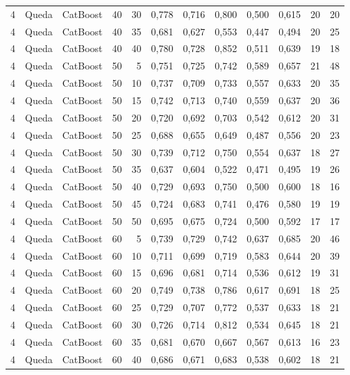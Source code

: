 \begin{longtable}{@{}rllrrrrrrrrr@{}}
4 & Queda & CatBoost & 40 & 30 & 0,778 & 0,716 & 0,800 & 0,500 & 0,615 & 20 & 20 \\
4 & Queda & CatBoost & 40 & 35 & 0,681 & 0,627 & 0,553 & 0,447 & 0,494 & 20 & 25 \\
4 & Queda & CatBoost & 40 & 40 & 0,780 & 0,728 & 0,852 & 0,511 & 0,639 & 19 & 18 \\
4 & Queda & CatBoost & 50 & 5 & 0,751 & 0,725 & 0,742 & 0,589 & 0,657 & 21 & 48 \\
4 & Queda & CatBoost & 50 & 10 & 0,737 & 0,709 & 0,733 & 0,557 & 0,633 & 20 & 35 \\
4 & Queda & CatBoost & 50 & 15 & 0,742 & 0,713 & 0,740 & 0,559 & 0,637 & 20 & 36 \\
4 & Queda & CatBoost & 50 & 20 & 0,720 & 0,692 & 0,703 & 0,542 & 0,612 & 20 & 31 \\
4 & Queda & CatBoost & 50 & 25 & 0,688 & 0,655 & 0,649 & 0,487 & 0,556 & 20 & 23 \\
4 & Queda & CatBoost & 50 & 30 & 0,739 & 0,712 & 0,750 & 0,554 & 0,637 & 18 & 27 \\
4 & Queda & CatBoost & 50 & 35 & 0,637 & 0,604 & 0,522 & 0,471 & 0,495 & 19 & 26 \\
4 & Queda & CatBoost & 50 & 40 & 0,729 & 0,693 & 0,750 & 0,500 & 0,600 & 18 & 16 \\
4 & Queda & CatBoost & 50 & 45 & 0,724 & 0,683 & 0,741 & 0,476 & 0,580 & 19 & 19 \\
4 & Queda & CatBoost & 50 & 50 & 0,695 & 0,675 & 0,724 & 0,500 & 0,592 & 17 & 17 \\
4 & Queda & CatBoost & 60 & 5 & 0,739 & 0,729 & 0,742 & 0,637 & 0,685 & 20 & 46 \\
4 & Queda & CatBoost & 60 & 10 & 0,711 & 0,699 & 0,719 & 0,583 & 0,644 & 20 & 39 \\
4 & Queda & CatBoost & 60 & 15 & 0,696 & 0,681 & 0,714 & 0,536 & 0,612 & 19 & 31 \\
4 & Queda & CatBoost & 60 & 20 & 0,749 & 0,738 & 0,786 & 0,617 & 0,691 & 18 & 25 \\
4 & Queda & CatBoost & 60 & 25 & 0,729 & 0,707 & 0,772 & 0,537 & 0,633 & 18 & 21 \\
4 & Queda & CatBoost & 60 & 30 & 0,726 & 0,714 & 0,812 & 0,534 & 0,645 & 18 & 21 \\
4 & Queda & CatBoost & 60 & 35 & 0,681 & 0,670 & 0,667 & 0,567 & 0,613 & 16 & 23 \\
4 & Queda & CatBoost & 60 & 40 & 0,686 & 0,671 & 0,683 & 0,538 & 0,602 & 18 & 21 \\

\end{longtable}
